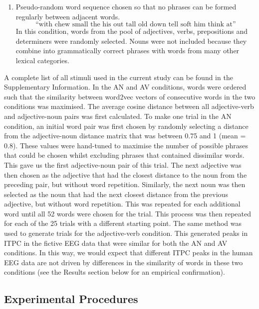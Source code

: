 \documentclass[10pt,letterpaper]{article}
\begin{document}
\begin{enumerate}
\item Pseudo-random word sequence chosen so that no phrases can be formed regularly between adjacent words.
\[
\label{eq:RR}
\text{``with chew small the his out tall old down tell soft him think at''}
\]
In this condition, words from the pool of adjectives, verbs, prepositions and determiners were randomly selected. Nouns were not included because they combine into grammatically correct phrases with words from many other lexical categories.
\end{enumerate}

A complete list of all stimuli used in the current study can be found in the Supplementary Information. In the AN and AV conditions, words were ordered such that the similarity between word2vec vectors of consecutive words in the two conditions was maximised. The average cosine distance between all adjective-verb and adjective-noun pairs was first calculated. To make one trial in the AN condition, an initial word pair was first chosen by randomly selecting a distance from the adjective-noun distance matrix that was between 0.75 and 1 (mean = 0.8). These values were hand-tuned to maximise the number of possible phrases that could be chosen whilst excluding phrases that contained dissimilar words. This gave us the first adjective-noun pair of this trial. The next adjective was then chosen as the adjective that had the closest distance to the noun from the preceding pair, but without word repetition. Similarly, the next noun was then selected as the noun that had the next closest distance from the previous adjective, but without word repetition. This was repeated for each additional word until all 52 words were chosen for the trial. This process was then repeated for each of the 25 trials with a different starting point. The same method was used to generate trials for the adjective-verb condition. This generated peaks in ITPC in the fictive EEG data that were similar for both the AN and AV conditions. In this way, we would expect that different ITPC peaks in the human EEG data are not driven by differences in the similarity of words in these two conditions (see the Results section below for an empirical confirmation).

\subsection*{Experimental Procedures}
\end{document}
